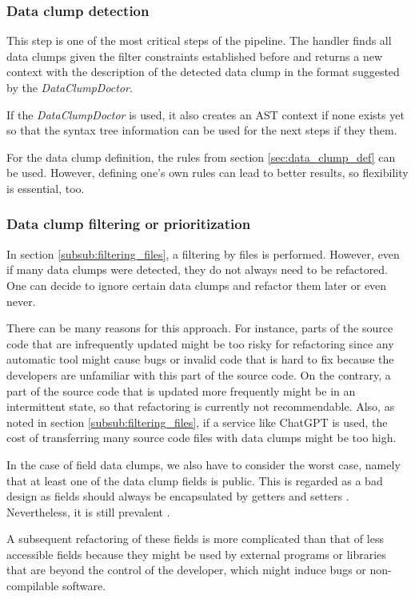 \subsubsection{Data clump detection}
This step is one of the most critical steps of the pipeline. 
The handler finds all data clumps given the filter constraints established before and returns a new context with the description of the detected data clump in the format suggested by the \textit{DataClumpDoctor}. 

If the \textit{DataClumpDoctor} is used, it also creates an \ac{AST} context if none exists yet so that the syntax tree information can be used for the next steps if they them. 

For the data clump definition, the rules from section \ref{sec:data_clump_def} can be used. However, defining one's own rules can lead to better results, so flexibility is essential, too. 

\subsubsection{Data clump filtering or prioritization} \label{subsub:filtering_data_clumps}
In section \ref{subsub:filtering_files}, a filtering by files is performed. However, even if many data clumps were detected, they do not always need to be refactored. One can decide to ignore certain data clumps and refactor them later or even never. 

There can be many reasons for this approach. For instance, parts of the source code that are infrequently updated might be too risky for refactoring since any automatic tool might cause bugs or invalid code that is hard to fix because the developers are unfamiliar with this part of the source code. On the contrary, a part of the source code that is updated more frequently might be in an intermittent state, so that refactoring is currently not recommendable. Also, as noted in section  \ref{subsub:filtering_files}, if a service like ChatGPT is used, the cost of transferring many source code files with data clumps might be too high. 

In the case of field data clumps, we also have to consider the worst case, namely that at least one of the data clump fields is public. This is regarded as a bad design as fields should always be encapsulated by getters and setters \cite{5680918}. Nevertheless, it is still prevalent \cite{5076631}.

A subsequent refactoring of these fields is more complicated than that of less accessible fields because they might be used by external programs or libraries that are beyond the control of the developer, which might induce bugs or non-compilable software. 


